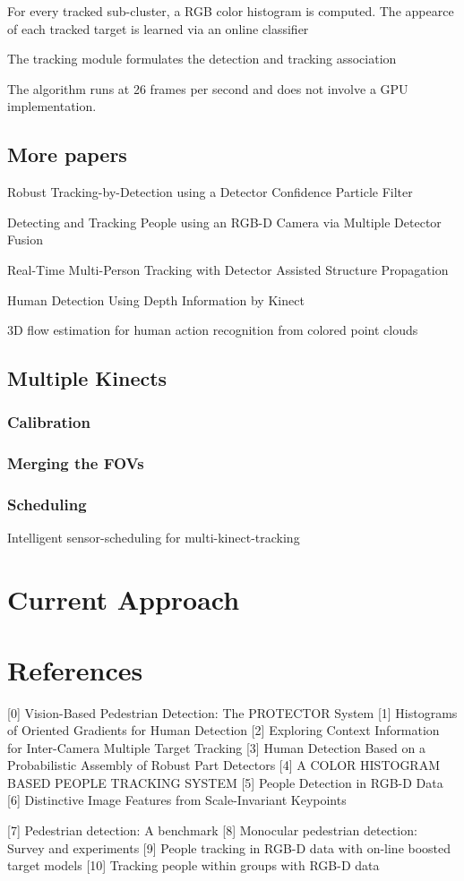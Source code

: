 \documentclass[paper=a4, fontsize=11pt]{scrartcl}
\numberwithin{equation}{section}		%
\numberwithin{figure}{section}			%
\numberwithin{table}{section}				%
\begin{document}
For every tracked sub-cluster, a RGB color histogram is computed. The appearce of each tracked target is learned via an online classifier

The tracking module formulates the detection and tracking association

The algorithm runs at 26 frames per second and does not involve a GPU implementation.

\subsection{More papers}

Robust Tracking-by-Detection using a Detector Confidence Particle Filter

Detecting and Tracking People using an RGB-D Camera via Multiple Detector
Fusion

Real-Time Multi-Person Tracking with Detector Assisted Structure Propagation

Human Detection Using Depth Information by Kinect

3D flow estimation for human action recognition from colored point clouds

\subsection{Multiple Kinects}

\subsubsection{Calibration}

\subsubsection{Merging the FOVs}

\subsubsection{Scheduling}

Intelligent sensor-scheduling for multi-kinect-tracking

\section{Current Approach}

\section{References}

[0] Vision-Based Pedestrian Detection: The PROTECTOR System
[1] Histograms of Oriented Gradients for Human Detection
[2] Exploring Context Information for Inter-Camera Multiple Target Tracking
[3] Human Detection Based on a Probabilistic Assembly of Robust Part Detectors
[4] A COLOR HISTOGRAM BASED PEOPLE TRACKING SYSTEM
[5] People Detection in RGB-D Data
[6] Distinctive Image Features from Scale-Invariant Keypoints


[7] Pedestrian detection: A benchmark
[8] Monocular pedestrian detection: Survey and experiments
[9] People tracking in RGB-D data with on-line boosted target models
[10] Tracking people within groups with RGB-D data
\end{document}
